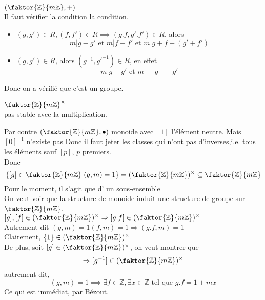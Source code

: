 \documentclass[../main.tex]{subfiles}
\begin{document}
\begin{exemple}
	$ ( \faktor { \mathbb{Z}} { m \mathbb{Z}}, + )$\\
	Il faut vérifier la condition la condition.\\
	\begin{itemize}
		\item  $( g,g' ) \in R, ( f,f') \in R \implies ( g.f, g'.f') \in R$, alors
			\[ 
				m | g-g' \text{ et } m | f-f' \text{ et }  m | g+f - ( g' + f')
			\]

		\item $(g,g') \in R$, alors $ ( g^{-1},g'^{-1}) \in R$, en effet
			\[ 
			m| g-g' \text{ et } m | -g - -g'
			\]
		
	\end{itemize}
	Donc on a vérifié que c'est un  groupe.
	
\end{exemple}
\begin{exemple}
$ \faktor { \mathbb{Z}} { m \mathbb{Z}}^{\times}$\\
pas stable avec la multiplication.
\end{exemple}
Par contre
$ ( \faktor { \mathbb{Z} } { m \mathbb{Z}}, \bullet)$ monoide avec $ [ 1]$ l'élément neutre.
Mais $ [ 0]^{-1}$ n'existe pas
Donc il faut jeter les classes qui n'ont pas d'inverses,i.e. tous les éléments sauf $[p]$, $p$ premiers.\\
Donc  
\[ 
\left\{ [ g] \in \faktor { \mathbb{Z}} { m \mathbb{Z}} | ( g,m)=1 \right\} = ( \faktor { \mathbb{Z}} { m \mathbb{Z}} )^{\times} \subseteq \faktor { \mathbb{Z}} { m\mathbb{Z}}
\]
Pour le moment, il s'agit que d' un sous-ensemble\\
On veut voir que la structure de monoide induit une structure de groupe sur $\faktor { \mathbb{Z}}{ m \mathbb{Z}}$.\\
$ [ g], [ f] \in (  \faktor { \mathbb{Z}}{ m \mathbb{Z}})^{\times} \Rightarrow [ g.f] \in(  \faktor { \mathbb{Z}}{ m \mathbb{Z}})^{\times}$\\
Autrement dit $ ( g,m)=1 ( f,m)=1 \Rightarrow ( g.f, m)=1$\\
Clairement, $ \left\{ 1 \right\} \in(  \faktor { \mathbb{Z}}{ m \mathbb{Z}})^{\times}$\\
De plus, soit $[g] \in (  \faktor { \mathbb{Z}}{ m \mathbb{Z}})^{\times}$, on veut montrer que
\[ 
\Rightarrow [ g^{-1}] \in (  \faktor { \mathbb{Z}}{ m \mathbb{Z}})^{\times}
\]
autrement dit,
\[ 
	( g,m)=1 \implies \exists f \in \mathbb{Z}, \exists x \in \mathbb{Z} \text{ tel que } g.f =1 + mx
\]
Ce qui est immédiat, par Bézout.\\
\end{document}
